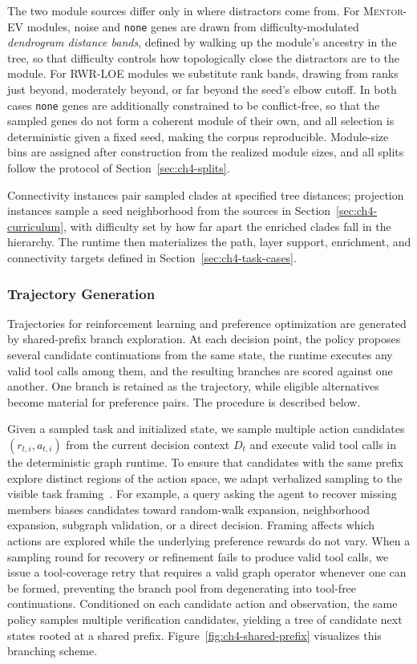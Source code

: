 The two module sources differ only in where distractors come from. For \textsc{Mentor-EV} modules, noise and \texttt{none} genes are drawn from difficulty-modulated \textit{dendrogram distance bands}, defined by walking up the module's ancestry in the tree, so that difficulty controls how topologically close the distractors are to the module. For RWR-LOE modules we substitute rank bands, drawing from ranks just beyond, moderately beyond, or far beyond the seed's elbow cutoff. In both cases \texttt{none} genes are additionally constrained to be conflict-free, so that the sampled genes do not form a coherent module of their own, and all selection is deterministic given a fixed seed, making the corpus reproducible. Module-size bins are assigned after construction from the realized module sizes, and all splits follow the protocol of Section~\ref{sec:ch4-splits}.

Connectivity instances pair sampled clades at specified tree distances; projection instances sample a seed neighborhood from the sources in Section~\ref{sec:ch4-curriculum}, with difficulty set by how far apart the enriched clades fall in the hierarchy. The runtime then materializes the path, layer support, enrichment, and connectivity targets defined in Section~\ref{sec:ch4-task-cases}.

\subsubsection{Trajectory Generation}\label{sec:ch4-traj-gen}
Trajectories for reinforcement learning and preference optimization are generated by shared-prefix branch exploration. At each decision point, the policy proposes several candidate continuations from the same state, the runtime executes any valid tool calls among them, and the resulting branches are scored against one another. One branch is retained as the trajectory, while eligible alternatives become material for preference pairs. The procedure is described below.

Given a sampled task and initialized state, we sample multiple action candidates $(r_{t,i}, a_{t,i})$ from the current decision context $D_t$ and execute valid tool calls in the deterministic graph runtime. To ensure that candidates with the same prefix explore distinct regions of the action space, we adapt verbalized sampling to the visible task framing~\cite{zhang2025verbalized}. For example, a query asking the agent to recover missing members biases candidates toward random-walk expansion, neighborhood expansion, subgraph validation, or a direct decision. Framing affects which actions are explored while the underlying preference rewards do not vary. When a sampling round for recovery or refinement fails to produce valid tool calls, we issue a tool-coverage retry that requires a valid graph operator whenever one can be formed, preventing the branch pool from degenerating into tool-free continuations. Conditioned on each candidate action and observation, the same policy samples multiple verification candidates, yielding a tree of candidate next states rooted at a shared prefix. Figure~\ref{fig:ch4-shared-prefix} visualizes this branching scheme.

